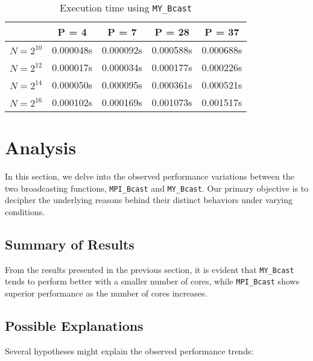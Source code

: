 \documentclass[12pt,a4paper]{article}
\begin{document}
\begin{table}[!htb]
    \centering
    \begin{tabular}{|c|c|c|c|c|}
    \hline
     & P = 4 & P = 7 & P = 28 & P = 37 \\ 
    \hline
    $N = 2^{10}$ & 0.000048s & 0.000092s & 0.000588s & 0.000688s \\ 
    \hline
    $N = 2^{12}$ & 0.000017s & 0.000034s & 0.000177s & 0.000226s \\ 
    \hline
    $N = 2^{14}$ & 0.000050s & 0.000095s & 0.000361s & 0.000521s \\ 
    \hline
    $N = 2^{16}$ & 0.000102s & 0.000169s & 0.001073s & 0.001517s \\ 
    \hline
    \end{tabular}
    \caption{Execution time using \texttt{MY\_Bcast}}
\end{table}


\section{Analysis}

In this section, we delve into the observed performance variations between the two broadcasting functions, \texttt{MPI\_Bcast} and \texttt{MY\_Bcast}. Our primary objective is to decipher the underlying reasons behind their distinct behaviors under varying conditions.

\subsection{Summary of Results}
From the results presented in the previous section, it is evident that \texttt{MY\_Bcast} tends to perform better with a smaller number of cores, while \texttt{MPI\_Bcast} shows superior performance as the number of cores increases.

\subsection{Possible Explanations}
Several hypotheses might explain the observed performance trends:
\end{document}
